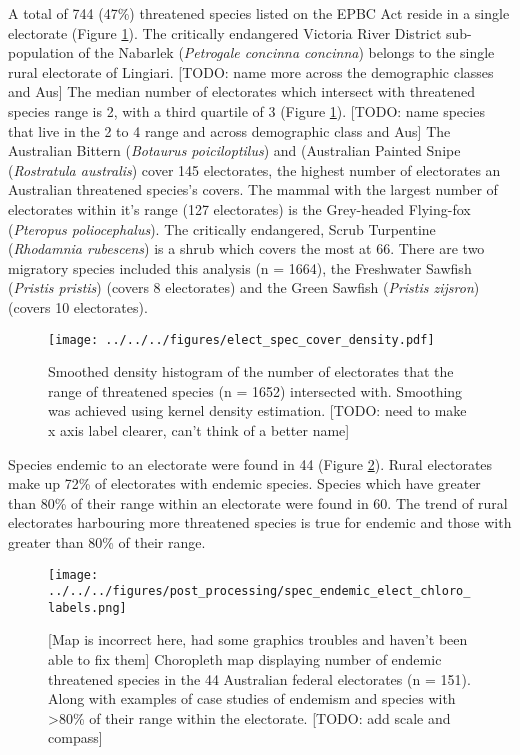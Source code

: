 \documentclass[a4paper,11pt]{article}
\begin{document}
A total of 744 (47\%) threatened species listed on the EPBC Act reside in a single electorate (Figure \ref{fig:hist}).
The critically endangered Victoria River District sub-population of the Nabarlek (\emph{Petrogale concinna concinna}) belongs to the single rural electorate of Lingiari.
[TODO: name more across the demographic classes and Aus]
The median number of electorates which intersect with threatened species range is 2, with a third quartile of 3 (Figure \ref{fig:hist}).
[TODO: name species that live in the 2 to 4 range and across demographic class and Aus]
The Australian Bittern (\emph{Botaurus poiciloptilus}) and (Australian Painted Snipe (\emph{Rostratula australis}) cover 145 electorates, the highest number of electorates an Australian threatened species's covers. The mammal with the largest number of electorates within it's range (127 electorates) is the Grey-headed Flying-fox (\emph{Pteropus poliocephalus}). The critically endangered, Scrub Turpentine (\emph{Rhodamnia rubescens}) is a shrub which covers the most at 66.
There are two migratory species included this analysis (n = 1664), the Freshwater Sawfish (\emph{Pristis pristis}) (covers 8 electorates) and the Green Sawfish (\emph{Pristis zijsron}) (covers 10 electorates).

\begin{figure}[H]
	\centering
    \texttt{[image: ../../../figures/elect\_spec\_cover\_density.pdf]}
    \caption{Smoothed density histogram of the number of electorates that the range of threatened species (n = 1652) intersected with. Smoothing was achieved using kernel density estimation. [TODO: need to make x axis label clearer, can't think of a better name]}
    \label{fig:hist}
\end{figure}

Species endemic to an electorate were found in 44 (Figure \ref{fig:combined_chloro}). Rural electorates make up 72\% of electorates with endemic species.
Species which have greater than 80\% of their range within an electorate were found in 60.
The trend of rural electorates harbouring more threatened species is true for endemic and those with greater than 80\% of their range.

\begin{figure}[H]
	\centering
    \texttt{[image: ../../../figures/post\_processing/spec\_endemic\_elect\_chloro\_labels.png]}
    \caption{[Map is incorrect here, had some graphics troubles and haven't been able to fix them] Choropleth map displaying number of endemic threatened species in the 44 Australian federal electorates (n = 151). Along with examples of case studies of endemism and species with >80\% of their range within the electorate. [TODO: add scale and compass]}
    \label{fig:combined_chloro}
\end{figure}
\end{document}
